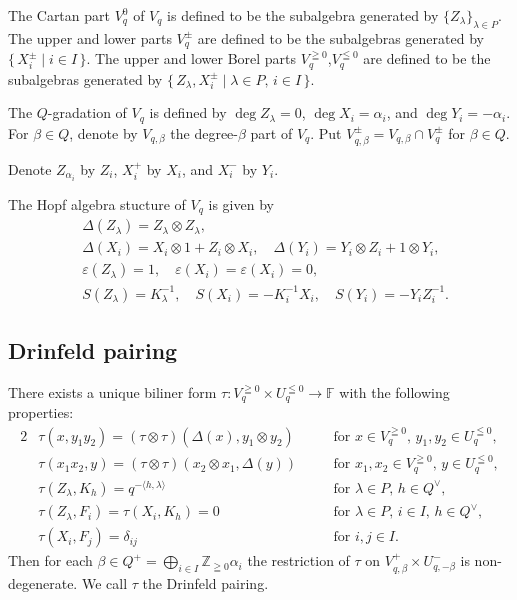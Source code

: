 \documentclass[12pt,a4paper]{article}
\newcommand\bra{\langle}
\newcommand\ket{\rangle}
\newcommand\Qv{Q^\vee}
\newcommand\eps{\varepsilon}
\newcommand\Z{{\mathbb Z}} %
\newcommand\F{{\mathbb F}} %
\theoremstyle{plain} %
\theoremstyle{definition} %
\theoremstyle{definition} %
\numberwithin{theorem}{section}
\numberwithin{equation}{section}
\numberwithin{figure}{section}
\numberwithin{table}{section}
\begin{document}
The Cartan part $V_q^0$ of $V_q$ is defined to be
the subalgebra generated by $\{Z_\lambda\}_{\lambda\in P}$.
The upper and lower parts $V_q^\pm$ are defined to be
the subalgebras generated 
by $\{\,X_i^\pm\mid i\in I\,\}$.
The upper and lower Borel parts $V_q^{\geqq0}$,$V_q^{\leqq0}$ 
are defined to be the subalgebras generated 
by $\{\,Z_\lambda,X_i^\pm\mid \lambda\in P,\, i\in I\,\}$.

The $Q$-gradation of $V_q$ is defined by 
$\deg Z_\lambda=0$, $\deg X_i=\alpha_i$, and $\deg Y_i=-\alpha_i$.
For $\beta\in Q$, denote by $V_{q,\beta}$ the degree-$\beta$ part of $V_q$.
Put $V^\pm_{q,\beta}=V_{q,\beta}\cap V_q^\pm$ for $\beta\in Q$.

Denote $Z_{\alpha_i}$ by $Z_i$, $X_i^+$ by $X_i$, and $X_i^-$ by $Y_i$.

The Hopf algebra stucture of $V_q$ is given by
\begin{align*}
 &
 \Delta(Z_\lambda) = Z_\lambda\otimes Z_\lambda,
 \\ &
 \Delta(X_i) = X_i\otimes 1   + Z_i\otimes X_i, \quad
 \Delta(Y_i) = Y_i\otimes Z_i +   1\otimes Y_i,
 \\ &
 \eps(Z_\lambda) = 1, \quad 
 \eps(X_i) = \eps(X_i) = 0,
 \\ &
 S(Z_\lambda) = K_\lambda^{-1}, \quad
 S(X_i) = -K_i^{-1}X_i, \quad S(Y_i) = -Y_iZ_i^{-1}.
\end{align*}

\subsection{Drinfeld pairing}

There exists a unique biliner form 
$\tau:V_q^{\geqq0}\times U_q^{\leqq0}\to\F$ 
with the following properties:
\begin{alignat*}{2}
 &
 \tau(x,y_1y_2) = (\tau\otimes\tau)(\Delta(x),y_1\otimes y_2)
 & &
 \quad \text{for $x\in V_q^{\geqq0}$, $y_1,y_2\in U_q^{\leqq 0}$},
 \\ &
 \tau(x_1x_2,y) = (\tau\otimes\tau)(x_2\otimes x_1,\Delta(y))
 & &
 \quad \text{for $x_1,x_2\in V_q^{\geqq0}$, $y\in U_q^{\leqq 0}$},
 \\ &
 \tau(Z_\lambda,K_h) = q^{-\bra h,\lambda\ket}
 & &
 \quad \text{for $\lambda\in P$, $h\in\Qv$},
 \\ &
 \tau(Z_\lambda,F_i) = \tau(X_i,K_h) = 0
 & &
 \quad \text{for $\lambda\in P$, $i\in I$, $h\in\Qv$},
 \\ &
 \tau(X_i,F_j) = \delta_{ij}
 & &
 \quad \text{for $i,j\in I$}.
\end{alignat*}
Then for each $\beta\in Q^+=\bigoplus_{i\in I}\Z_{\geqq0}\alpha_i$ 
the restriction of $\tau$ on $V^+_{q,\beta}\times U^-_{q,-\beta}$ 
is non-degenerate.
We call $\tau$ the Drinfeld pairing.
\end{document}
